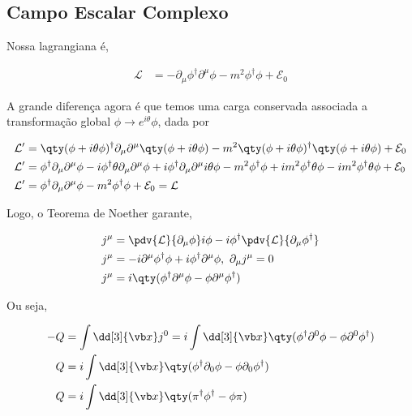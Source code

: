 \documentclass[twoside]{amsart}
\numberwithin{equation}{section}
\begin{document}
\begin{refsection}
\section{Campo Escalar Complexo}

Nossa lagrangiana é,

\begin{align}
    \mathcal L&=-\partial_\mu\phi^\dagger\partial^\mu\phi-m^2\phi^\dagger\phi+\mathcal E_0
\end{align}

A grande diferença agora é que temos uma carga conservada associada a transformação global $\phi\rightarrow e^{i\theta}\phi$, dada por

\begin{align}
    \mathcal L'&=\qty(\phi+i\theta\phi)^\dagger\partial_\mu\partial^\mu\qty(\phi+i\theta\phi)-m^2\qty(\phi+i\theta\phi)^\dagger\qty(\phi+i\theta\phi)+\mathcal E_0\\
    \mathcal L'&=\phi^\dagger\partial_\mu\partial^\mu\phi-i\phi^\dagger\theta\partial_\mu\partial^\mu\phi+i\phi^\dagger\partial_\mu\partial^\mu i\theta\phi-m^2\phi^\dagger\phi+im^2\phi^\dagger\theta\phi-im^2\phi^\dagger\theta\phi+\mathcal E_0\\
    \mathcal L'&=\phi^\dagger\partial_\mu\partial^\mu\phi-m^2\phi^\dagger\phi+\mathcal E_0=\mathcal L
\end{align}

Logo, o Teorema de Noether garante,

\begin{align}
    j^\mu&=\pdv{\mathcal L}{\partial_\mu\phi}i\phi-i\phi^\dagger\pdv{\mathcal L}{\partial_\mu\phi^\dagger}\\
    j^\mu&=-i\partial^\mu\phi^\dagger\phi+i\phi^\dagger\partial^\mu\phi,\ \partial_\mu j^\mu=0\\
    j^\mu&=i\qty(\phi^\dagger\partial^\mu\phi-\phi\partial^\mu\phi^\dagger)
\end{align}

Ou seja,

\begin{align}
    -Q&=\int\dd[3]{\vb x}j^0=i\int\dd[3]{\vb x}\qty(\phi^\dagger\partial^0\phi-\phi\partial^0\phi^\dagger)\\
    Q&=i\int\dd[3]{\vb x}\qty(\phi^\dagger\partial_0\phi-\phi\partial_0\phi^\dagger)\\
    Q&=i\int\dd[3]{\vb x}\qty(\pi^\dagger\phi^\dagger-\phi\pi)
\end{align}


\end{refsection}
\end{document}

